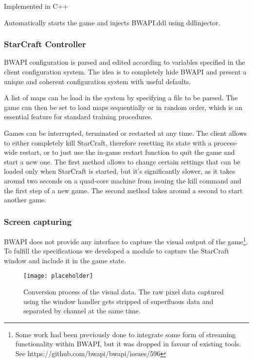 Implemented in C++

Automatically starts the game and injects BWAPI.ddl using ddlinjector. 

\subsubsection{StarCraft Controller}

BWAPI configuration is parsed and edited according to variables specified in the
client configuration system. The idea is to completely hide BWAPI and present a
unique and coherent configuration system with useful defaults.

A list of maps can be load in the system by specifying a file to be parsed. The
game can then be set to load maps sequentially or in random order, which is an
essential feature for standard training procedures.

Games can be interrupted, terminated or restarted at any time. The client allows
to either completely kill StarCraft, therefore resetting its state with a
process-wide restart, or to just use the in-game restart function to quit the
game and start a new one. The first method allows to change certain settings
that can be loaded only when StarCraft is started, but it's significantly
slower, as it takes around two seconds on a quad-core machine from issuing the
kill command and the first step of a new game. The second method takes around a
second to start another game. %



\subsubsection{Screen capturing}


BWAPI does not provide any interface to capture the visual output of the
game\footnote{Some work had been previously done to integrate some form of
  streaming functionality within BWAPI, but it was dropped in favour of existing
  tools. See https://github.com/bwapi/bwapi/issues/596}. To fulfill the
specifications we developed a module to capture the StarCraft window and include
it in the game state.

\begin{figure}[h]
    \centering
    \texttt{[image: placeholder]}
    \caption{Conversion process of the visual data. The raw pixel data captured
      using the window handler gets stripped of superfluous data and separated
      by channel at the same time.}
    \label{fig:capt_conv}
\end{figure}

